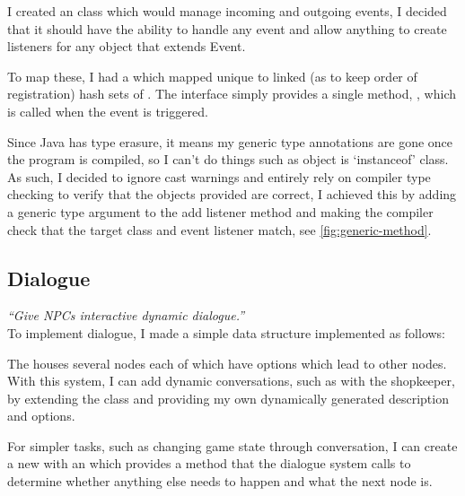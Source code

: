 \documentclass{article}
\begin{document}
\begin{multicols}{2}
                    I created an  class which would manage incoming and outgoing events, I decided that it should have the ability to handle any event and allow anything to create listeners for any object that extends Event.

                    To map these, I had a  which mapped unique  to linked (as to keep order of registration) hash sets of . The interface simply provides a single method, , which is called when the event is triggered.

                    Since Java has type erasure, it means my generic type annotations are gone once the program is compiled, so I can't do things such as object is `instanceof' class. As such, I decided to ignore cast warnings and entirely rely on compiler type checking to verify that the objects provided are correct, I achieved this by adding a generic type argument to the add listener method and making the compiler check that the target class and event listener match, see \autoref{fig:generic-method}.

                \subsection{Dialogue}
                \textit{``Give NPCs interactive dynamic dialogue.''} \\

                    To implement dialogue, I made a simple data structure implemented as follows:


                    The  houses several nodes each of which have options which lead to other nodes. With this system, I can add dynamic conversations, such as with the shopkeeper, by extending the  class and providing my own dynamically generated description and options.

                    For simpler tasks, such as changing game state through conversation, I can create a new  with an  which provides a method that the dialogue system calls to determine whether anything else needs to happen and what the next node is.


\end{multicols}
\end{document}
